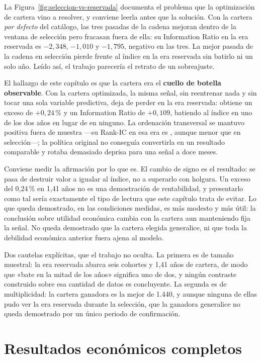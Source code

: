 La Figura~\ref{fig:seleccion-vs-reservada} documenta el problema que la optimización de cartera vino
a resolver, y conviene leerla antes que la solución. Con la cartera \emph{por defecto} del catálogo,
las tres pasadas de la cadena mejoran dentro de la ventana de selección pero fracasan fuera de ella:
su Information Ratio en la era reservada es $-2{,}348$, $-1{,}010$ y $-1{,}795$, negativo en las
tres. La mejor pasada de la cadena en selección pierde frente al índice en la era reservada sin
batirlo ni un solo año. Leído así, el trabajo parecería el retrato de un sobreajuste.

El hallazgo de este capítulo es que la cartera era el \textbf{cuello de botella observable}. Con la cartera
optimizada, la misma señal, sin reentrenar nada y sin tocar una sola variable predictiva, deja de
perder en la era reservada: obtiene un exceso de $+0{,}24$\,\% y un Information Ratio de $+0{,}109$,
batiendo al índice en uno de los dos años en lugar de en ninguno. La ordenación transversal se
mantuvo positiva fuera de muestra ---su Rank-IC en esa era es \RankICReservado{}, aunque menor que
en selección---; la política original no conseguía convertirla en un resultado comparable y rotaba
demasiado deprisa para una señal a doce meses.

Conviene medir la afirmación por lo que es. El cambio de signo es el resultado: se pasa de destruir
valor a igualar al índice, no a superarlo con holgura. Un exceso del 0,24\,\% en 1,41 años no es una
demostración de rentabilidad, y presentarlo como tal sería exactamente el tipo de lectura que este
capítulo trata de evitar. Lo que queda demostrado, en las condiciones medidas, es más modesto y más
útil: la conclusión sobre utilidad económica cambia con la cartera aun manteniendo fija la señal.
No queda demostrado que la cartera elegida generalice, ni que toda la debilidad económica anterior
fuera ajena al modelo.

Dos cautelas explícitas, que el trabajo no oculta. La primera es de tamaño muestral: la era
reservada abarca seis cohortes y 1,41 años de cartera, de modo que «bate en la mitad de los años»
significa uno de dos, y ningún contraste construido sobre esa cantidad de datos es concluyente. La
segunda es de multiplicidad: la cartera ganadora es la mejor de 1.440, y aunque ninguna de ellas
pudo ver la era reservada durante la selección, que la ganadora generalice no queda demostrado por
un único periodo de confirmación.

\section{Resultados económicos completos}
\label{sec:economia-completa}

